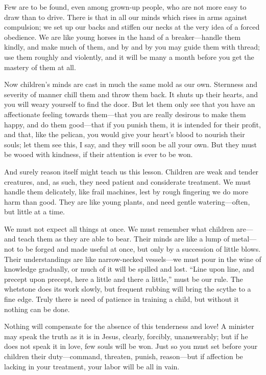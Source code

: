 \documentclass[
]{book}
\begin{document}
Few are to be found, even among grown-up people, who are not more easy to draw than to drive. There is that in all our minds which rises in arms against compulsion; we set up our backs and stiffen our necks at the very idea of a forced obedience. We are like young horses in the hand of a breaker---handle them kindly, and make much of them, and by and by you may guide them with thread; use them roughly and violently, and it will be many a month before you get the mastery of them at all.

Now children's minds are cast in much the same mold as our own. Sternness and severity of manner chill them and throw them back. It shuts up their hearts, and you will weary yourself to find the door. But let them only see that you have an affectionate feeling towards them---that you are really desirous to make them happy, and do them good---that if you punish them, it is intended for their profit, and that, like the pelican, you would give your heart's blood to nourish their souls; let them see this, I say, and they will soon be all your own. But they must be wooed with kindness, if their attention is ever to be won.

And surely reason itself might teach us this lesson. Children are weak and tender creatures, and, as such, they need patient and considerate treatment. We must handle them delicately, like frail machines, lest by rough fingering we do more harm than good. They are like young plants, and need gentle watering---often, but little at a time.

We must not expect all things at once. We must remember what children are---and teach them as they are able to bear. Their minds are like a lump of metal---not to be forged and made useful at once, but only by a succession of little blows. Their understandings are like narrow-necked vessels---we must pour in the wine of knowledge gradually, or much of it will be spilled and lost. ``Line upon line, and precept upon precept, here a little and there a little,'' must be our rule. The whetstone does its work slowly, but frequent rubbing will bring the scythe to a fine edge. Truly there is need of patience in training a child, but without it nothing can be done.

Nothing will compensate for the absence of this tenderness and love! A minister may speak the truth as it is in Jesus, clearly, forcibly, unanswerably; but if he does not speak it in love, few souls will be won. Just so you must set before your children their duty---command, threaten, punish, reason---but if affection be lacking in your treatment, your labor will be all in vain.
\end{document}
